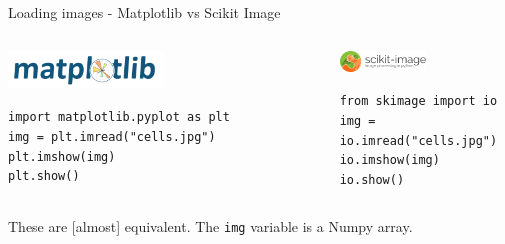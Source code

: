\documentclass[9pt, aspectratio=169]{beamer}
\begin{document}
\begin{frame}
    {Loading images - Matplotlib vs Scikit Image}

    \begin{columns}
        \begin{column}{0.5\textwidth}
            \begin{center}
                \includegraphics[width=0.5\textwidth]{matplotlib_logo.png}
            \end{center}
            \begin{codebox}
                \texttt{import matplotlib.pyplot as plt\\
                    img = plt.imread("cells.jpg")\\
                    plt.imshow(img)\\
                    plt.show()
                }
            \end{codebox}
        \end{column}
        \pause
        \begin{column}{0.5\textwidth}
            \begin{center}
                \includegraphics[width=0.5\textwidth]{skimage_logo.png}
            \end{center}
            \begin{codebox}
                \texttt{from skimage import io\\
                    img = io.imread("cells.jpg")\\
                    io.imshow(img)\\
                    io.show()
                }
            \end{codebox}
        \end{column}
    \end{columns}
    \pause
    \centering
    These are [almost] equivalent. The \texttt{img} variable is a Numpy array.
\end{frame}
\end{document}
